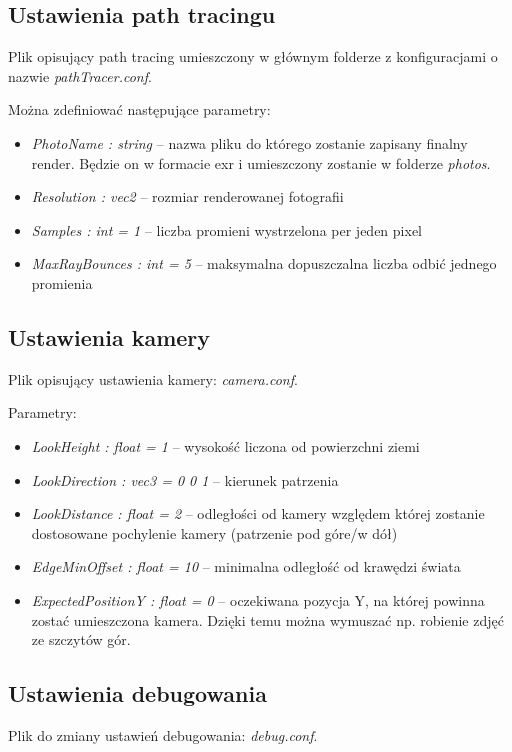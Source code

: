 \documentclass[inz,longabstract]{iithesis}
\begin{document}
        \subsection{Ustawienia path tracingu}
        Plik opisujący path tracing umieszczony w głównym folderze z konfiguracjami o nazwie \textit{pathTracer.conf}.
        
        Można zdefiniować następujące parametry:
        \begin{itemize}
            \item \textit{PhotoName : string} -- nazwa pliku do którego zostanie zapisany finalny render. Będzie on w formacie exr i umieszczony zostanie w folderze \textit{photos}.
            \item \textit{Resolution : vec2} -- rozmiar renderowanej fotografii
            \item \textit{Samples : int = 1} -- liczba promieni wystrzelona per jeden pixel
            \item \textit{MaxRayBounces : int = 5} -- maksymalna dopuszczalna liczba odbić jednego promienia  
        \end{itemize}

        \subsection{Ustawienia kamery}
        Plik opisujący ustawienia kamery: \textit{camera.conf}.
        
        Parametry:
        \begin{itemize}
            \item \textit{LookHeight : float = 1} -- wysokość liczona od  powierzchni ziemi 
            \item \textit{LookDirection : vec3 = 0 0 1} -- kierunek patrzenia 
            \item \textit{LookDistance : float = 2} -- odległości od kamery względem której zostanie dostosowane pochylenie kamery (patrzenie pod góre/w dół)
            \item \textit{EdgeMinOffset : float = 10} -- minimalna odległość od krawędzi świata  
            \item \textit{ExpectedPositionY : float = 0} -- oczekiwana pozycja Y, na której powinna zostać umieszczona kamera. Dzięki temu można wymuszać np. robienie zdjęć ze szczytów gór. 
        \end{itemize}
        
        \subsection{Ustawienia debugowania}
        Plik do zmiany ustawień debugowania: \textit{debug.conf}.
        
\end{document}
